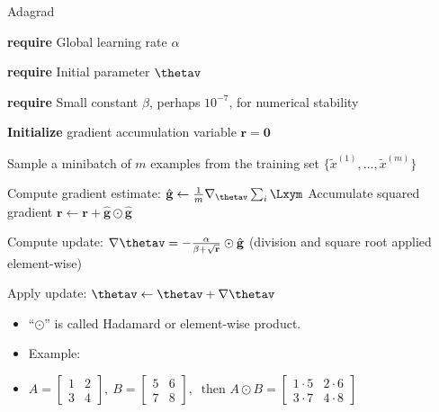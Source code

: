 \begin{vbframe}{Adagrad}
  
  \begin{algorithm}[H]
    \small
    \caption{Adagrad}
    \begin{algorithmic}[1]
    \scriptsize 
    \State \textbf{require} Global learning rate $\alpha$ \strut
    \State \textbf{require} Initial parameter $\thetav$ \strut
    \State \textbf{require} Small constant $\beta$, perhaps $10^{-7}$, for numerical stability \strut
    \State \textbf{Initialize} gradient accumulation variable $\mathbf{r} = \mathbf{0} $
         \State \parbox[t]{\dimexpr\linewidth-\algorithmicindent}{Sample a minibatch of $m$ examples from the training set $\{\tilde{x}^{(1)},\dots,\tilde{x}^{(m)}\}$ \strut}
         \State Compute gradient estimate: $\hat{\mathbf{g}} \leftarrow \frac{1}{m} \nabla_{\thetav} \sum_{i} \Lxym$
         \State Accumulate squared gradient $\mathbf{r} \leftarrow \mathbf{r} + \hat{\mathbf{g}} \odot  \hat{\mathbf{g}}$
         \State \parbox[t]{\dimexpr\linewidth-\algorithmicindent}{Compute update: $\nabla \thetav = - \frac{\alpha}{\beta + \sqrt\mathbf{r}} \odot \hat{\mathbf{g}}$ (division and square root applied element-wise) \strut}
         \State Apply update: $\thetav \leftarrow \thetav + \nabla\thetav$
       \EndWhile
    \end{algorithmic}
  \end{algorithm}
  \begin{itemize}
  \small
    \item \enquote{$\odot$} is called Hadamard or element-wise product.
    \item Example:
    \vspace{0.2cm}
    \item[] $A =
            \begin{bmatrix}
              1 & 2 \\
              3 & 4
            \end{bmatrix}, \ 
            B =
            \begin{bmatrix}
              5 & 6 \\
              7 & 8
            \end{bmatrix}, \ \text{ then } A \odot B =
            \begin{bmatrix}
              1 \cdot 5 & 2 \cdot 6 \\
              3 \cdot 7 & 4 \cdot 8
            \end{bmatrix}$
  \end{itemize}
\end{vbframe}

